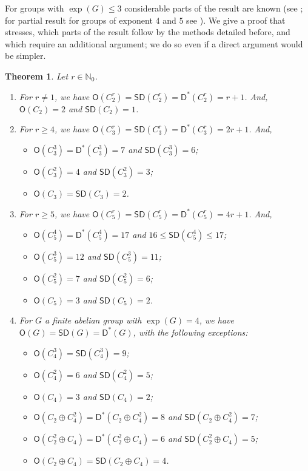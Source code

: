 \documentclass{amsart}
\newtheorem{thm}{Theorem}[section]
\theoremstyle{definition}
\numberwithin{equation}{section}
\begin{document}
For groups with $\exp(G)\le 3$ considerable parts of the result are known
(see \cite{baliski,chabela,GGS,sub}; for
partial result for groups of exponent $4$ and $5$ see \cite{baginski,sub}). We give a proof that stresses, which parts of the result follow by the methods
detailed before, and which require an additional argument; we do so even if a direct argument
would be simpler.

\begin{thm}
Let $r \in \mathbb{N}_0$.
\begin{enumerate}
\item For $r\neq 1$, we have ${\mathsf{O}}(C_2^r)= {\mathsf{SD}}(C_2^r)={\mathsf{D}^{\ast}}(C_2^r)=r+1$. And, ${\mathsf{O}}(C_2)=2$ and ${\mathsf{SD}}(C_2)=1$.
\item For $r\ge 4$, we have ${\mathsf{O}}(C_3^r)= {\mathsf{SD}}(C_3^r)={\mathsf{D}^{\ast}}(C_3^r)=2 r + 1$. And, 
\begin{itemize}
\item ${\mathsf{O}}(C_3^3)={\mathsf{D}^{\ast}}(C_3^3)=7$ and ${\mathsf{SD}}(C_3^3)=6$;
\item ${\mathsf{O}}(C_3^2)=4$ and ${\mathsf{SD}}(C_3^2)=3$;
\item ${\mathsf{O}}(C_3)= {\mathsf{SD}}(C_3)=2$.
\end{itemize}
\item For $r \ge 5$, we have ${\mathsf{O}}(C_5^r)={\mathsf{SD}}(C_5^r)={\mathsf{D}^{\ast}}(C_5^r)=4r+1$.
And,
\begin{itemize}
\item ${\mathsf{O}}(C_5^4)={\mathsf{D}^{\ast}}(C_5^4)=17$ and $16 \le {\mathsf{SD}}(C_5^4)\le 17$;
\item ${\mathsf{O}}(C_5^3)=12$ and ${\mathsf{SD}}(C_5^3)=11$;
\item ${\mathsf{O}}(C_5^2)=7$ and ${\mathsf{SD}}(C_5^2)=6$; 
\item${\mathsf{O}}(C_5)=3$ and ${\mathsf{SD}}(C_5)=2$.
\end{itemize}
\item For $G$ a finite abelian group with $\exp(G)=4$, we have ${\mathsf{O}}(G)={\mathsf{SD}}(G)={\mathsf{D}^{\ast}}(G)$, with the following exceptions:
\begin{itemize}
\item ${\mathsf{O}}(C_4^3)={\mathsf{SD}}(C_4^3)=9$;
\item ${\mathsf{O}}(C_4^2)=6$ and ${\mathsf{SD}}(C_4^2)=5$;
\item ${\mathsf{O}}(C_4)=3$ and ${\mathsf{SD}}(C_4)=2$;
\item ${\mathsf{O}}(C_2 \oplus C_4^2) = {\mathsf{D}^{\ast}}(C_2 \oplus C_4^2) = 8$ and ${\mathsf{SD}}(C_2\oplus C_4^2)=7$;
\item ${\mathsf{O}}(C_2^2 \oplus C_4) = {\mathsf{D}^{\ast}}(C_2^2 \oplus C_4) = 6$ and ${\mathsf{SD}}(C_2^2\oplus C_4)=5$;
\item ${\mathsf{O}}(C_2 \oplus C_4) = {\mathsf{SD}}(C_2 \oplus C_4)=4$.
\end{itemize}
\end{enumerate}
\end{thm}
\end{document}

